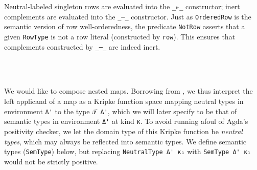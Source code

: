 \documentclass[authoryear, acmsmall, screen, review, nonacm]{acmart}
\begin{document}
Neutral-labeled singleton rows are evaluated into the \verb!_▹_! constructor; inert complements are evaluated into the \verb!_─_! constructor. Just as \verb!OrderedRow! is the semantic version of row well-orderedness, the predicate \verb!NotRow! asserts that a given \verb!RowType! is not a row literal (constructed by \verb!row!). This ensures that complements constructed by \verb!_─_! are indeed inert.

\begin{code}%
%
\>[2]\AgdaSpace{}%
\AgdaSymbol{:}\AgdaSpace{}%
\AgdaSpace{}%
\AgdaSpace{}%
\AgdaSpace{}%
\AgdaSpace{}%
\AgdaSpace{}%
\AgdaSpace{}%
\AgdaSpace{}%
\AgdaSpace{}%
\AgdaSpace{}%
\AgdaSpace{}%
\AgdaOperator{\AgdaInductiveConstructor{R[}}\AgdaSpace{}%
\AgdaSpace{}%
\AgdaOperator{\AgdaInductiveConstructor{]}}\<%
\\
%
\>[2]\AgdaSpace{}%
\AgdaSymbol{:}%
\>[4685I]\AgdaSymbol{(}\AgdaSpace{}%
\AgdaSpace{}%
\AgdaSymbol{:}\AgdaSpace{}%
\AgdaSpace{}%
\AgdaSpace{}%
\AgdaSpace{}%
\AgdaOperator{\AgdaInductiveConstructor{R[}}\AgdaSpace{}%
\AgdaSpace{}%
\AgdaOperator{\AgdaInductiveConstructor{]}}\AgdaSymbol{)}\AgdaSpace{}%
\AgdaSpace{}%
\AgdaSymbol{\{}\AgdaSpace{}%
\AgdaSymbol{:}\AgdaSpace{}%
\AgdaSpace{}%
\AgdaSpace{}%
\AgdaSpace{}%
\AgdaSpace{}%
\AgdaSymbol{\}}\AgdaSpace{}%
\<%
\\
\>[.][@{}l@{}]\<[4685I]%
\>[8]\AgdaSpace{}%
\AgdaSpace{}%
\AgdaSpace{}%
\AgdaOperator{\AgdaInductiveConstructor{R[}}\AgdaSpace{}%
\AgdaSpace{}%
\AgdaOperator{\AgdaInductiveConstructor{]}}\<%
\end{code}

\Ni We would like to compose nested maps. Borrowing from \citet{AllaisBM13}, we thus interpret the left applicand of a map as a Kripke function space mapping neutral types in environment \verb!Δ'! to the type \verb!𝒯 Δ'!, which we will later specify to be that of semantic types in environment \verb!Δ'! at kind \verb!κ!. To avoid running afoul of Agda's positivity checker, we let the domain type of this Kripke function be \emph{neutral types}, which may always be reflected into semantic types. We define semantic types (\verb!SemType!) below, but replacing \verb!NeutralType Δ' κ₁! with \verb!SemType Δ' κ₁! would not be strictly positive. 
\end{document}
